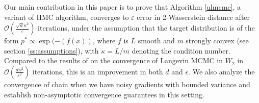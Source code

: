 Our main contribution in this paper is to prove that Algorithm \ref{ulmcmc}, a variant of HMC algorithm, converges to $\varepsilon$ error in 2-Wasserstein distance after $\mathcal{O}\left(\frac{\sqrt{d}\kappa^2}{\varepsilon}\right)$ iterations, under the assumption that the target distribution is of the form $p^*\propto \exp(-(f(x))$, where $f$ is $L$ smooth and $m$ strongly convex (see section \ref{ss:assumptions}), with $\kappa= L/m$ denoting the condition number. Compared to the results of \cite{durmus} on the convergence of Langevin MCMC in $W_2$ in $\mathcal{O}\left(\frac{d\kappa^2}{\varepsilon^2}\right)$ iterations, this is an improvement in both $d$ and $\epsilon$. We also analyze the convergence of chain when we have noisy gradients with bounded variance and establish non-asymptotic convergence guarantees in this setting.